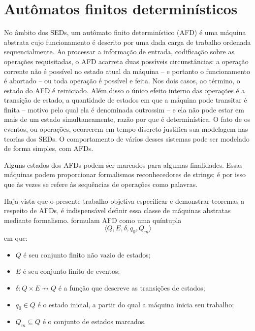 \chapter{Autômatos finitos determinísticos}
\label{cap:afd}

No âmbito dos SEDs, um autômato finito determinístico (AFD) é uma máquina abstrata cujo funcionamento é descrito por uma dada carga de trabalho ordenada sequencialmente. Ao processar a informação de entrada, codificação sobre as operações requisitadas, o AFD acarreta duas possíveis circunstâncias: a operação corrente não é possível no estado atual da máquina -- e portanto o funcionamento é abortado -- ou toda operação é possível e feita. Nos dois casos, ao término, o estado do AFD é reiniciado. Além disso o único efeito interno das operações é a transição de estado, a quantidade de estados em que a máquina pode transitar é finita -- motivo pelo qual ela é denominada outrossim -- e ela não pode estar em mais de um estado simultaneamente, razão por que é determinística. O fato de os eventos, ou operações, ocorrerem em tempo discreto justifica sua modelagem nas teorias dos SEDs. O comportamento de vários desses sistemas pode ser modelado de forma simples, com AFDs.

Alguns estados dos AFDs podem ser marcados para algumas finalidades. Essas máquinas podem proporcionar formalismos reconhecedores de strings; é por isso que às vezes se refere às sequências de operações como palavras.

Haja vista que o presente trabalho objetiva especificar e demonstrar teoremas a respeito de AFDs, é indispensável definir essa classe de máquinas abstratas mediante formalismo.  formulam AFD como uma quíntupla \begin{equation}\label{eq:afd_hopcroft}\langle Q, E, \delta, q_0, Q_m \rangle\end{equation} em que: \begin{itemize}
    \item $Q$ é seu conjunto finito não vazio de estados;
    \item $E$ é seu conjunto finito de eventos;
    \item $\delta : Q \times E \nrightarrow Q$ é a função que descreve as transições de estados;
    \item $q_0 \in Q$ é o estado inicial, a partir do qual a máquina inicia seu trabalho;
    \item $Q_m \subseteq Q$ é o conjunto de estados marcados.
\end{itemize}


